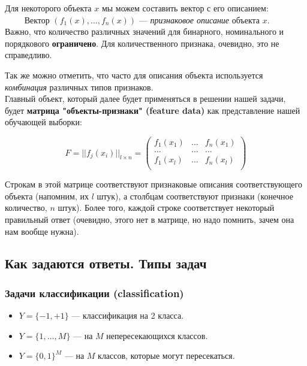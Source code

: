 \documentclass{article}
\begin{document}
Для некоторого объекта $x$ мы можем составить вектор с его описанием:
\\

$\qquad$ Вектор $(f_1(x), \ldots, f_n(x))$ --- \textit{признаковое описание} объекта $x$.
\\

Важно, что количество различных значений для бинарного, номинального и порядкового \textbf{ограничено}. Для количественного признака, очевидно, это не справедливо.

Так же можно отметить, что часто для описания объекта используется \textit{комбинация} различных типов признаков.
\\

Главный объект, который далее будет применяться в решении нашей задачи, будет \textbf{матрица "объекты-признаки" (feature data)} как представление нашей обучающей выборки:

$$F = ||f_j(x_i)||_{l \times n}=
\begin{pmatrix}
f_1(x_1) & \ldots & f_n(x_1)\\
\ldots & \ldots & \ldots\\
f_1(x_l) & \ldots & f_n(x_l)\\
\end{pmatrix}$$

Строкам в этой матрице соответствуют признаковые описания соответствующего объекта (напомним, их $l$ штук), а столбцам соответствуют признаки (конечное количество, $n$ штук). Более того, каждой строке соответствует некоторый правильный ответ (очевидно, этого нет в матрице, но надо помнить, зачем она нам вообще нужна).

\subsection{Как задаются ответы. Типы задач}
\subsubsection{Задачи классификации (classification)}

\begin{itemize}
\item $Y = \{-1, +1\}$ --- классификация на 2 класса.
\item $Y = \{1, \ldots, M\} $ --- на $M$ непересекающихся классов.
\item $Y = \{0, 1\}^M $ --- на $M$ классов, которые могут пересекаться.
\end{itemize}
\end{document}
